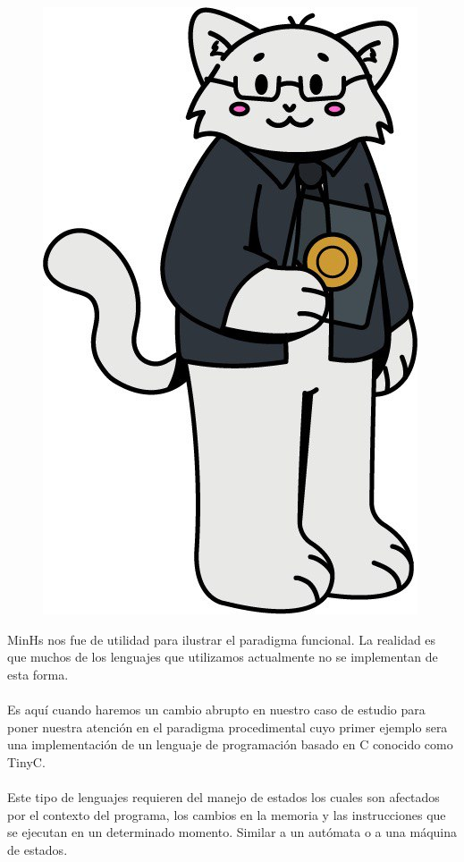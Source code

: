 
\begin{figure}[htbp]
    \centerline{\includegraphics[scale=.35]{assets/09_Dennis_Ritchie_gato.jpg}}
\end{figure}

\bigskip

\textsf{MinHs} nos fue de utilidad para ilustrar el paradigma funcional. La realidad es que muchos de los lenguajes que utilizamos actualmente no se implementan de esta forma.\\\\
Es aquí cuando haremos un cambio abrupto en nuestro caso de estudio para poner nuestra atención en el paradigma procedimental cuyo primer ejemplo sera una implementación de un lenguaje de programación basado en \textsf{C} conocido como \textsf{TinyC}.\\\\
Este tipo de lenguajes requieren del manejo de estados los cuales son afectados por el contexto del programa, los cambios en la memoria y las instrucciones que se ejecutan en un determinado momento. Similar a un autómata o a una máquina de estados.



